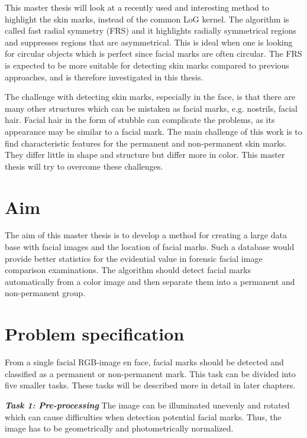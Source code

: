 This master thesis will look at a recently used and interesting method to highlight the skin marks, instead of the common LoG kernel. The algorithm is called fast radial symmetry (FRS) \cite{twins,automatic_detector_2015} and it highlights radially symmetrical regions and suppresses regions that are asymmetrical. This is ideal when one is looking for circular objects which is perfect since facial marks are often circular. The FRS is expected to be more suitable for detecting skin marks compared to previous approaches, and is therefore investigated in this thesis.

The challenge with detecting skin marks, especially in the face, is that there are many other structures which can be mistaken as facial marks, e.g. nostrils, facial hair. Facial hair in the form of stubble can complicate the problems, as its appearance may be similar to a facial mark. The main challenge of this work is to find characteristic features for the permanent and non-permanent skin marks. They differ little in shape and structure but differ more in color. This master thesis will try to overcome these challenges. 


\section{Aim}

The aim of this master thesis is to develop a method for creating a large data base with facial images and the location of facial marks. Such a database would provide better statistics for the evidential value in forensic facial image comparison examinations. The algorithm should detect facial marks automatically from a color image and then separate them into a permanent and non-permanent group.

\section{Problem specification}

From a single facial RGB-image en face, facial marks should be detected and classified as a permanent or non-permanent mark. This task can be divided into five smaller tasks. These tasks will be described more in detail in later chapters.

\textbf{\textit{Task 1: Pre-processing}}
The image can be illuminated unevenly and rotated which can cause difficulties when detection potential facial marks. Thus, the image has to be geometrically and photometrically normalized. 


